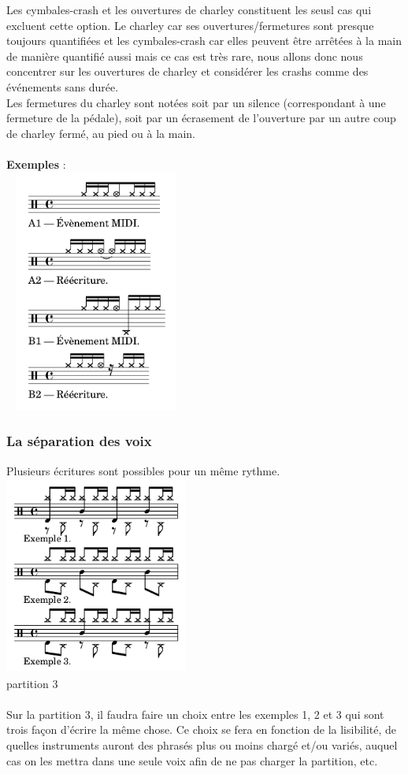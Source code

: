 Les cymbales-crash et les ouvertures de charley constituent les seusl cas qui excluent cette option. Le charley car ses ouvertures/fermetures sont presque toujours quantifiées et les cymbales-crash car elles peuvent être arrêtées à la main de manière quantifié aussi mais ce cas est très rare, nous allons donc nous concentrer sur les ouvertures de charley et considérer les crashs comme des événements sans durée.\\
Les fermetures du charley sont notées soit par un silence (correspondant à une fermeture de la pédale), soit par un écrasement de l’ouverture par un autre coup de charley fermé, au pied ou à la main.\\\\
\textbf{Exemples} :\\
\includegraphics[height=80mm, width=60mm]{z_images/reecriture/exemples_charley_1.png}

\subsubsection{La séparation des voix}
Plusieurs écritures sont possibles pour un même rythme.
\includegraphics[height=65mm, width=60mm]{z_images/1_description_notation/separation/0_exemples_separation.png}\\
partition 3\\\\
Sur la partition 3, il faudra faire un choix entre les exemples 1, 2 et 3 qui sont trois façon d’écrire la même chose. Ce choix se fera en fonction de la lisibilité, de quelles instruments auront des phrasés plus ou moins chargé et/ou variés, auquel cas on les mettra dans une seule voix afin de ne pas charger la partition, etc. 
